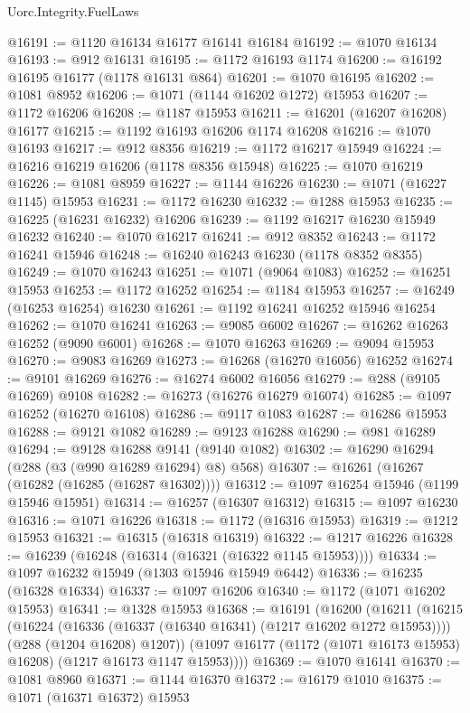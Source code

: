 \begin{lexlean}{Uorc.Integrity.FuelLaws}
\begin{coremodule}
@16191 := @1120 @16134 @16177 @16141 @16184
@16192 := @1070 @16134
@16193 := @912 @16131
@16195 := @1172 @16193 @1174
@16200 := @16192 @16195 @16177 (@1178 @16131 @864)
@16201 := @1070 @16195
@16202 := @1081 @8952
@16206 := @1071 (@1144 @16202 @1272) @15953
@16207 := @1172 @16206
@16208 := @1187 @15953
@16211 := @16201 (@16207 @16208) @16177
@16215 := @1192 @16193 @16206 @1174 @16208
@16216 := @1070 @16193
@16217 := @912 @8356
@16219 := @1172 @16217 @15949
@16224 := @16216 @16219 @16206 (@1178 @8356 @15948)
@16225 := @1070 @16219
@16226 := @1081 @8959
@16227 := @1144 @16226
@16230 := @1071 (@16227 @1145) @15953
@16231 := @1172 @16230
@16232 := @1288 @15953
@16235 := @16225 (@16231 @16232) @16206
@16239 := @1192 @16217 @16230 @15949 @16232
@16240 := @1070 @16217
@16241 := @912 @8352
@16243 := @1172 @16241 @15946
@16248 := @16240 @16243 @16230 (@1178 @8352 @8355)
@16249 := @1070 @16243
@16251 := @1071 (@9064 @1083)
@16252 := @16251 @15953
@16253 := @1172 @16252
@16254 := @1184 @15953
@16257 := @16249 (@16253 @16254) @16230
@16261 := @1192 @16241 @16252 @15946 @16254
@16262 := @1070 @16241
@16263 := @9085 @6002
@16267 := @16262 @16263 @16252 (@9090 @6001)
@16268 := @1070 @16263
@16269 := @9094 @15953
@16270 := @9083 @16269
@16273 := @16268 (@16270 @16056) @16252
@16274 := @9101 @16269
@16276 := @16274 @6002 @16056
@16279 := @288 (@9105 @16269) @9108
@16282 := @16273 (@16276 @16279 @16074)
@16285 := @1097 @16252 (@16270 @16108)
@16286 := @9117 @1083
@16287 := @16286 @15953
@16288 := @9121 @1082
@16289 := @9123 @16288
@16290 := @981 @16289
@16294 := @9128 @16288 @9141 (@9140 @1082)
@16302 := @16290 @16294 (@288 (@3 (@990 @16289 @16294) @8) @568)
@16307 := @16261 (@16267 (@16282 (@16285 (@16287 @16302))))
@16312 := @1097 @16254 @15946 (@1199 @15946 @15951)
@16314 := @16257 (@16307 @16312)
@16315 := @1097 @16230
@16316 := @1071 @16226
@16318 := @1172 (@16316 @15953)
@16319 := @1212 @15953
@16321 := @16315 (@16318 @16319)
@16322 := @1217 @16226
@16328 := @16239 (@16248 (@16314 (@16321 (@16322 @1145 @15953))))
@16334 := @1097 @16232 @15949 (@1303 @15946 @15949 @6442)
@16336 := @16235 (@16328 @16334)
@16337 := @1097 @16206
@16340 := @1172 (@1071 @16202 @15953)
@16341 := @1328 @15953
@16368 := @16191
    (@16200
      (@16211
        (@16215
          (@16224 (@16336 (@16337 (@16340 @16341) (@1217 @16202 @1272 @15953))))
          (@288 (@1204 @16208) @1207))
        (@1097 @16177 (@1172 (@1071 @16173 @15953) @16208) (@1217 @16173 @1147 @15953))))
@16369 := @1070 @16141
@16370 := @1081 @8960
@16371 := @1144 @16370
@16372 := @16179 @1010
@16375 := @1071 (@16371 @16372) @15953

\end{coremodule}
\end{lexlean}
